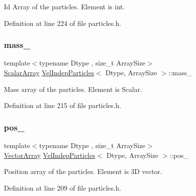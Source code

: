 Id Array of the particles. Element is int. 



Definition at line 224 of file particles.\+h.

\mbox{\label{class_vel_indep_particles_a68671eca04638e42f30c79291f89e1e4}} 
\subsubsection{\texorpdfstring{mass\+\_\+}{mass\_}}
{\footnotesize\ttfamily template$<$typename Dtype , size\+\_\+t Array\+Size$>$ \\
\mbox{\hyperlink{class_vel_indep_particles_abd6e6b0ffbbab4ebc078efd77f6a365a}{Scalar\+Array}} \mbox{\hyperlink{class_vel_indep_particles}{Vel\+Indep\+Particles}}$<$ Dtype, Array\+Size $>$\+::mass\+\_\+\hspace{0.3cm}{\ttfamily [protected]}}



Mass array of the particles. Element is Scalar. 



Definition at line 215 of file particles.\+h.

\mbox{\label{class_vel_indep_particles_aff576cd5ee9f773e84d9b7473df8f647}} 
\subsubsection{\texorpdfstring{pos\+\_\+}{pos\_}}
{\footnotesize\ttfamily template$<$typename Dtype , size\+\_\+t Array\+Size$>$ \\
\mbox{\hyperlink{class_vel_indep_particles_a27580f65b6523bfb6900520af2e44708}{Vector\+Array}} \mbox{\hyperlink{class_vel_indep_particles}{Vel\+Indep\+Particles}}$<$ Dtype, Array\+Size $>$\+::pos\+\_\+\hspace{0.3cm}{\ttfamily [protected]}}



Position array of the particles. Element is 3D vector. 



Definition at line 209 of file particles.\+h.

